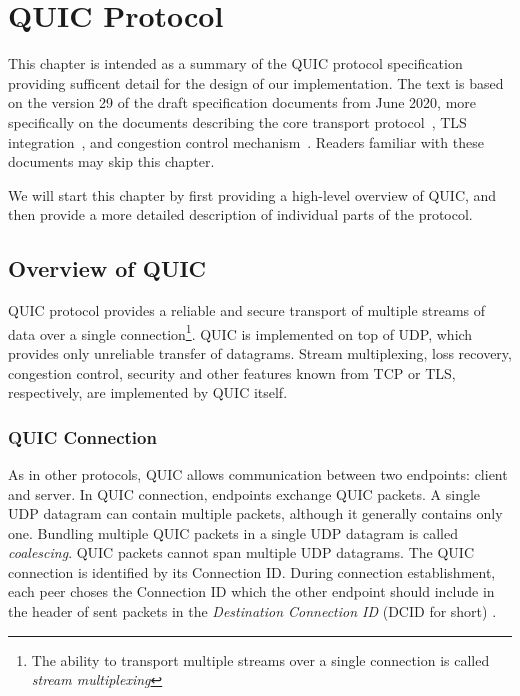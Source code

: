 
\chapter{QUIC Protocol}\label{chap:02-quic}

This chapter is intended as a summary of the QUIC protocol specification providing sufficent detail
for the design of our implementation. The text is based on the version 29 of the draft specification
documents from June 2020, more specifically on the documents describing the core transport
protocol~\cite{draft-ietf-quic-transport}, TLS integration~\cite{draft-ietf-quic-tls}, and
congestion control mechanism~\cite{draft-ietf-quic-recovery}. Readers familiar with these documents
may skip this chapter.

We will start this chapter by first providing a high-level overview of QUIC, and then provide a more
detailed description of individual parts of the protocol.

\section{Overview of QUIC}

QUIC protocol provides a reliable and secure transport of multiple streams of data over a single
connection\footnote{The ability to transport multiple streams over a single connection is called
  \textit{stream multiplexing}}. QUIC is implemented on top of UDP, which provides only unreliable
transfer of datagrams. Stream multiplexing, loss recovery, congestion control, security and other
features known from TCP or TLS, respectively, are implemented by QUIC itself.

\subsection{QUIC Connection}
As in other protocols, QUIC allows communication between two endpoints: client and server. In QUIC
connection, endpoints exchange QUIC packets. A single UDP datagram can contain multiple packets,
although it generally contains only one. Bundling multiple QUIC packets in a single UDP datagram is
called \textit{coalescing}. QUIC packets cannot span multiple UDP datagrams. The QUIC connection is
identified by its Connection ID\@.  During connection establishment, each peer choses the  Connection ID which the other endpoint should
include in the header of sent packets in the \textit{Destination Connection ID} (DCID for short)
.

